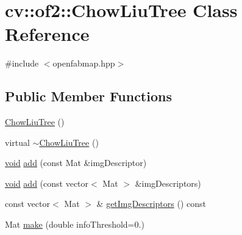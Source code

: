 \hypertarget{classcv_1_1of2_1_1ChowLiuTree}{\section{cv\-:\-:of2\-:\-:Chow\-Liu\-Tree Class Reference}
\label{classcv_1_1of2_1_1ChowLiuTree}
}


{\ttfamily \#include $<$openfabmap.\-hpp$>$}

\subsection*{Public Member Functions}
\begin{DoxyCompactItemize}
\item 
\hyperlink{classcv_1_1of2_1_1ChowLiuTree_aa89a635e2485b2b6e7921d5b3878eea9}{Chow\-Liu\-Tree} ()
\item 
virtual \hyperlink{classcv_1_1of2_1_1ChowLiuTree_a984a2306b4f3289a94c7bc68cb999644}{$\sim$\-Chow\-Liu\-Tree} ()
\item 
\hyperlink{legacy_8hpp_a8bb47f092d473522721002c86c13b94e}{void} \hyperlink{classcv_1_1of2_1_1ChowLiuTree_a900c63fd09e5a99f8fe714bec033ef78}{add} (const Mat \&img\-Descriptor)
\item 
\hyperlink{legacy_8hpp_a8bb47f092d473522721002c86c13b94e}{void} \hyperlink{classcv_1_1of2_1_1ChowLiuTree_a80ec6e8656c0f8e56ec97c225f89e88c}{add} (const vector$<$ Mat $>$ \&img\-Descriptors)
\item 
const vector$<$ Mat $>$ \& \hyperlink{classcv_1_1of2_1_1ChowLiuTree_ad68d452c9473ef09ecb97408375008b4}{get\-Img\-Descriptors} () const 
\item 
Mat \hyperlink{classcv_1_1of2_1_1ChowLiuTree_ab9c8c25fa61123698782643d98b20c07}{make} (double info\-Threshold=0.)
\end{DoxyCompactItemize}


